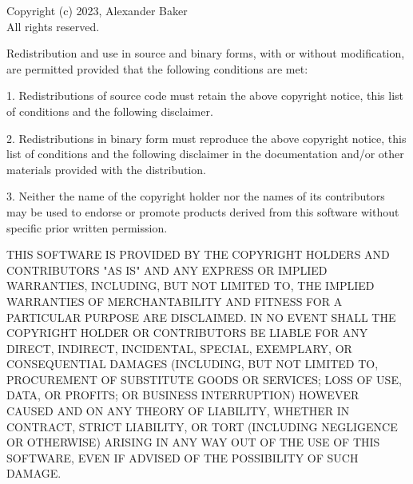 Copyright (c) 2023, Alexander Baker \\
All rights reserved.

Redistribution and use in source and binary forms, with or without
modification, are permitted provided that the following conditions are met:

1. Redistributions of source code must retain the above copyright notice, this
   list of conditions and the following disclaimer.

2. Redistributions in binary form must reproduce the above copyright notice,
   this list of conditions and the following disclaimer in the documentation
   and/or other materials provided with the distribution.

3. Neither the name of the copyright holder nor the names of its
   contributors may be used to endorse or promote products derived from
   this software without specific prior written permission.

THIS SOFTWARE IS PROVIDED BY THE COPYRIGHT HOLDERS AND CONTRIBUTORS "AS IS"
AND ANY EXPRESS OR IMPLIED WARRANTIES, INCLUDING, BUT NOT LIMITED TO, THE
IMPLIED WARRANTIES OF MERCHANTABILITY AND FITNESS FOR A PARTICULAR PURPOSE ARE
DISCLAIMED. IN NO EVENT SHALL THE COPYRIGHT HOLDER OR CONTRIBUTORS BE LIABLE
FOR ANY DIRECT, INDIRECT, INCIDENTAL, SPECIAL, EXEMPLARY, OR CONSEQUENTIAL
DAMAGES (INCLUDING, BUT NOT LIMITED TO, PROCUREMENT OF SUBSTITUTE GOODS OR
SERVICES; LOSS OF USE, DATA, OR PROFITS; OR BUSINESS INTERRUPTION) HOWEVER
CAUSED AND ON ANY THEORY OF LIABILITY, WHETHER IN CONTRACT, STRICT LIABILITY,
OR TORT (INCLUDING NEGLIGENCE OR OTHERWISE) ARISING IN ANY WAY OUT OF THE USE
OF THIS SOFTWARE, EVEN IF ADVISED OF THE POSSIBILITY OF SUCH DAMAGE.
